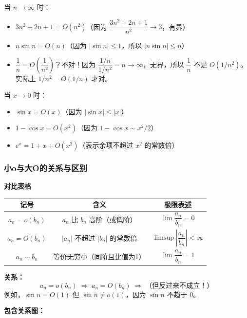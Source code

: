 \documentclass{ctexart}
\newenvironment{custom}[1]{\par\noindent \textbf{#1}\quad}{\par\vspace{1em}}
\begin{document}
\begin{example}[大O记号的例子]
当 \(n \to \infty\) 时：
\begin{itemize}
\item \(3n^2 + 2n + 1 = O(n^2)\)（因为 \(\dfrac{3n^2+2n+1}{n^2} \to 3\)，有界）
\item \(n \sin n = O(n)\)（因为 \(|\sin n| \leq 1\)，所以 \(|n \sin n| \leq n\)）
\item \(\dfrac{1}{n} = O\left(\dfrac{1}{n^2}\right)\)？不对！因为 \(\dfrac{1/n}{1/n^2} = n \to \infty\)，无界，所以 \(\dfrac{1}{n}\) 不是 \(O(1/n^2)\)。实际上 \(1/n^2 = O(1/n)\) 才对。
\end{itemize}

当 \(x \to 0\) 时：
\begin{itemize}
\item \(\sin x = O(x)\)（因为 \(|\sin x| \leq |x|\)）
\item \(1 - \cos x = O(x^2)\)（因为 \(1-\cos x \sim x^2/2\)）
\item \(e^x = 1 + x + O(x^2)\)（表示余项不超过 \(x^2\) 的常数倍）
\end{itemize}
\end{example}

\subsubsection{小o与大O的关系与区别}

\begin{custom}{对比表格}
\begin{tabular}{|c|c|c|}
\hline
\textbf{记号} & \textbf{含义} & \textbf{极限表述} \\
\hline
\(a_n = o(b_n)\) & \(a_n\) 比 \(b_n\) 高阶（或低阶） & \(\lim \dfrac{a_n}{b_n} = 0\) \\
\hline
\(a_n = O(b_n)\) & \(|a_n|\) 不超过 \(|b_n|\) 的常数倍 & \(\limsup \left|\dfrac{a_n}{b_n}\right| < \infty\) \\
\hline
\(a_n \sim b_n\) & 等价无穷小（同阶且比值为1） & \(\lim \dfrac{a_n}{b_n} = 1\) \\
\hline
\end{tabular}

\textbf{关系：}
\[
a_n = o(b_n) \;\Rightarrow\; a_n = O(b_n) \;\Rightarrow\; \text{（但反过来不成立！）}
\]
例如，\(\sin n = O(1)\) 但 \(\sin n \neq o(1)\)，因为 \(\sin n\) 不趋于 0。

\textbf{包含关系图：}
\begin{center}
\end{center}
\end{custom}
\end{document}
